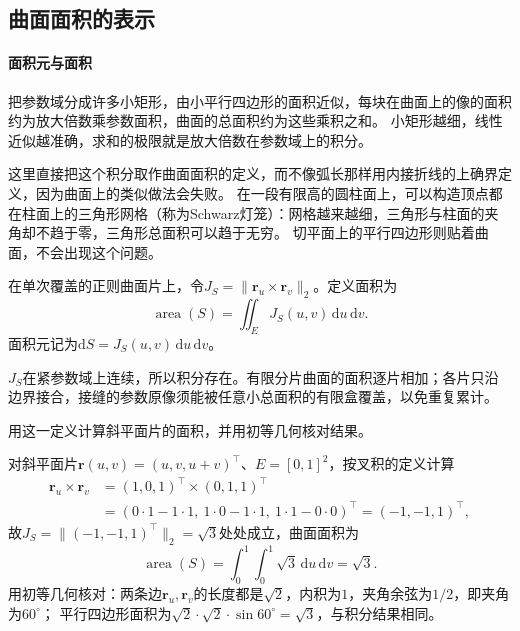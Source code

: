\subsection{曲面面积的表示}

\paragraph{面积元与面积}

把参数域分成许多小矩形，由小平行四边形的面积近似，每块在曲面上的像的面积约为放大倍数乘参数面积，曲面的总面积约为这些乘积之和。
小矩形越细，线性近似越准确，求和的极限就是放大倍数在参数域上的积分。

这里直接把这个积分取作曲面面积的定义，而不像弧长那样用内接折线的上确界定义，因为曲面上的类似做法会失败。
在一段有限高的圆柱面上，可以构造顶点都在柱面上的三角形网格（称为Schwarz灯笼）：网格越来越细，三角形与柱面的夹角却不趋于零，三角形总面积可以趋于无穷。
切平面上的平行四边形则贴着曲面，不会出现这个问题。

\begin{definition}[曲面面积]
\label{def:analysis-surface-area-measure}
在单次覆盖的正则曲面片上，令$J_S=\|\bm r_u\times\bm r_v\|_2$。定义面积为
\begin{equation}
 \operatorname{area}(S)=\iint_E J_S(u,v)\,\mathrm du\,\mathrm dv.
 \label{eq:analysis-surface-area}
\end{equation}
面积元记为$\mathrm dS=J_S(u,v)\,\mathrm du\,\mathrm dv$。
\end{definition}

$J_S$在紧参数域上连续，所以积分存在。有限分片曲面的面积逐片相加；各片只沿边界接合，接缝的参数原像须能被任意小总面积的有限盒覆盖，以免重复累计。

用这一定义计算斜平面片的面积，并用初等几何核对结果。

\begin{example}[斜平面片的面积]
\label{ex:analysis-tilted-plane-area}
对斜平面片$\bm r(u,v)=(u,v,u+v)^\top$、$E=[0,1]^2$，按叉积的定义计算
\[
 \begin{aligned}
 \bm r_u\times\bm r_v
 &=(1,0,1)^\top\times(0,1,1)^\top\\
 &=(0\cdot1-1\cdot1,\ 1\cdot0-1\cdot1,\ 1\cdot1-0\cdot0)^\top
 =(-1,-1,1)^\top,
 \end{aligned}
\]
故$J_S=\lVert(-1,-1,1)^\top\rVert_2=\sqrt3$处处成立，曲面面积为
\[
 \operatorname{area}(S)=\int_0^1\int_0^1\sqrt3\,\mathrm du\,\mathrm dv=\sqrt3.
\]
用初等几何核对：两条边$\bm r_u,\bm r_v$的长度都是$\sqrt2$，内积为$1$，夹角余弦为$1/2$，即夹角为$60^\circ$；
平行四边形面积为$\sqrt2\cdot\sqrt2\cdot\sin60^\circ=\sqrt3$，与积分结果相同。
\end{example}


